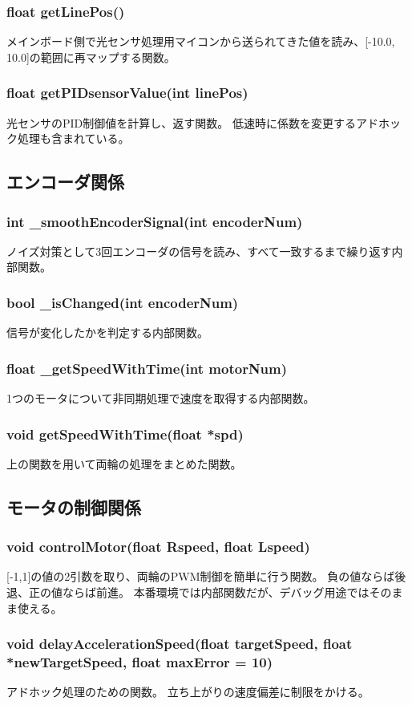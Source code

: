 \documentclass{ltjsreport}
\begin{document}
\subsubsection{float getLinePos()}
メインボード側で光センサ処理用マイコンから送られてきた値を読み、[-10.0, 10.0]の範囲に再マップする関数。
\subsubsection{float getPIDsensorValue(int linePos)}
光センサのPID制御値を計算し、返す関数。
低速時に係数を変更するアドホック処理も含まれている。



\subsection{エンコーダ関係}
\subsubsection{int \_smoothEncoderSignal(int encoderNum)}
ノイズ対策として3回エンコーダの信号を読み、すべて一致するまで繰り返す内部関数。
\subsubsection{bool \_isChanged(int encoderNum)}
信号が変化したかを判定する内部関数。
\subsubsection{float \_getSpeedWithTime(int motorNum)}
1つのモータについて非同期処理で速度を取得する内部関数。
\subsubsection{void getSpeedWithTime(float *spd)}
上の関数を用いて両輪の処理をまとめた関数。
\subsection{モータの制御関係}
\subsubsection{void controlMotor(float Rspeed, float Lspeed)}
[-1,1]の値の2引数を取り、両輪のPWM制御を簡単に行う関数。
負の値ならば後退、正の値ならば前進。
本番環境では内部関数だが、デバッグ用途ではそのまま使える。

\subsubsection{void delayAccelerationSpeed(float targetSpeed, float *newTargetSpeed, float maxError = 10)}
アドホック処理のための関数。
立ち上がりの速度偏差に制限をかける。
\end{document}
